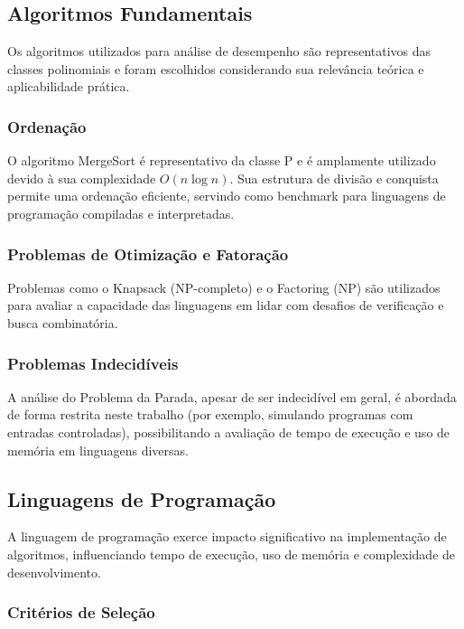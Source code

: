 \documentclass[12pt, a4paper]{article}
\begin{document}
\subsection{Algoritmos Fundamentais}

Os algoritmos utilizados para análise de desempenho são representativos das classes polinomiais e foram escolhidos considerando sua relevância teórica e aplicabilidade prática.

\subsubsection{Ordenação}

O algoritmo MergeSort é representativo da classe P e é amplamente utilizado devido à sua complexidade \( O(n \log n) \). Sua estrutura de divisão e conquista permite uma ordenação eficiente, servindo como benchmark para linguagens de programação compiladas e interpretadas.

\subsubsection{Problemas de Otimização e Fatoração}

Problemas como o Knapsack (NP-completo) e o Factoring (NP) são utilizados para avaliar a capacidade das linguagens em lidar com desafios de verificação e busca combinatória.

\subsubsection{Problemas Indecidíveis}

A análise do Problema da Parada, apesar de ser indecidível em geral, é abordada de forma restrita neste trabalho (por exemplo, simulando programas com entradas controladas), possibilitando a avaliação de tempo de execução e uso de memória em linguagens diversas.

\subsection{Linguagens de Programação}

A linguagem de programação exerce impacto significativo na implementação de algoritmos, influenciando tempo de execução, uso de memória e complexidade de desenvolvimento.

\subsubsection{Critérios de Seleção}
\end{document}
